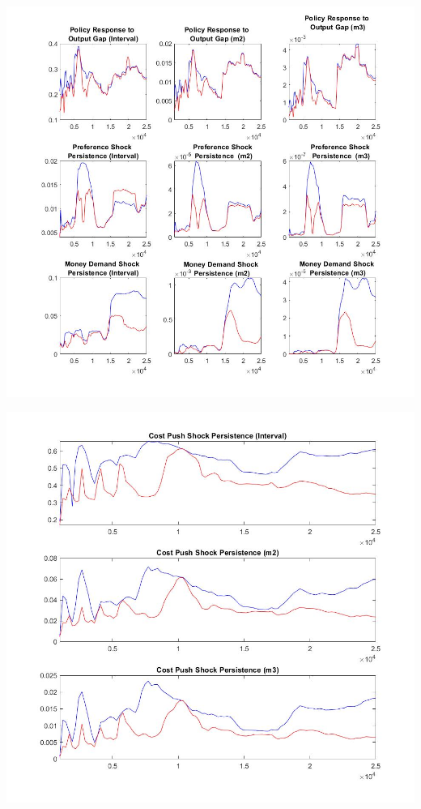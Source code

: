 \documentclass[11pt,preprint, authoryear]{elsarticle}
\let\origfigure\figure
\let\endorigfigure\endfigure
\renewenvironment{figure}[1][2] {
    \expandafter\origfigure\expandafter[H]
} {
    \endorigfigure
}
\numberwithin{equation}{section}
\numberwithin{figure}{section}
\numberwithin{table}{section}
\begin{document}
\begin{figure}
    \centering 
    \begin{minipage}[t]{8.2cm} 
        \centering 
        \includegraphics[width=\linewidth]{mctay5.jpg} 
    \end{minipage} 
    \hspace{0.1cm} 
    \begin{minipage}[t]{8.2cm} 
        \centering 
        \includegraphics[width=\linewidth]{mctay6.jpg} 
    \end{minipage}
    \caption{(c) MCMC - Taylor Rule}
    \label{mctay56}
\end{figure}
\end{document}
